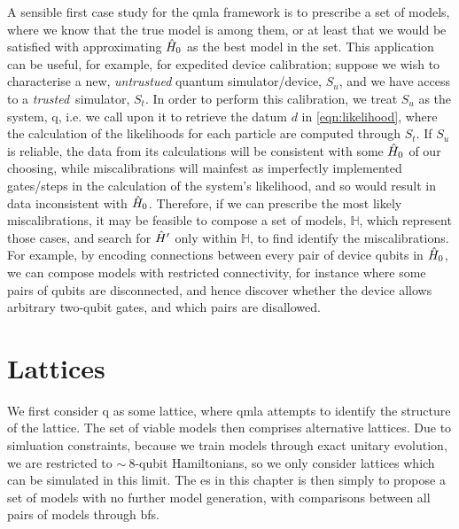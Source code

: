 A sensible first case study for the \gls{qmla} framework is to prescribe a set of models, 
    where we know that the \gls{true model} is among them, or at least that we would be satisfied with 
    approximating $\hat{H}_0$ as the best model in the set. 
This application can be useful, for example, for expedited device calibration; 
    suppose we wish to characterise a new, \emph{untrustued} quantum simulator/device, $S_u$, 
    and we have access to a \emph{trusted}\footnotemark \  simulator, $S_t$. 
In order to perform this calibration, 
    we treat $S_u$ as the system, \gls{q}, i.e. we call upon it to retrieve the datum $d$ in \cref{eqn:likelihood}, 
    where the calculation of the \glspl{likelihood}  for each particle are computed through $S_t$. 
If $S_u$ is reliable, the data from its calculations will be consistent with some $\hat{H}_0$ of our choosing, 
    while miscalibrations will mainfest as imperfectly implemented gates/steps in the calculation of the system's likelihood, 
    and so would result in data inconsistent with $\hat{H}_0$. 
Therefore, if we can prescribe the most likely miscalibrations, it may be feasible to compose a set 
    of models, $\mathbb{H}$, which represent those cases, and search for $\hat{H}^{\prime}$ only within $\mathbb{H}$,
    to find identify the miscalibrations. 
For example, by encoding connections between every pair of device qubits in $\hat{H}_0$, 
    we can compose models with restricted connectivity, for instance where some pairs of qubits are disconnected, 
    and hence discover whether the device allows arbitrary two-qubit gates, 
    and which pairs are disallowed. 



\section{Lattices}\label{sec:lattices}
We first consider \gls{q} as some lattice, where \gls{qmla} attempts to identify the structure of the lattice. 
The set of viable models then comprises alternative lattices.
Due to simluation constraints, because we train models through exact unitary evolution, 
    we are restricted to $\sim~8$-qubit Hamiltonians, so we only consider lattices which can 
    be simulated in this limit. 
The \gls{es} in this chapter is then simply to propose a set of models with no further model generation, 
    with comparisons between all pairs of models through \glspl{bf}.
\par

